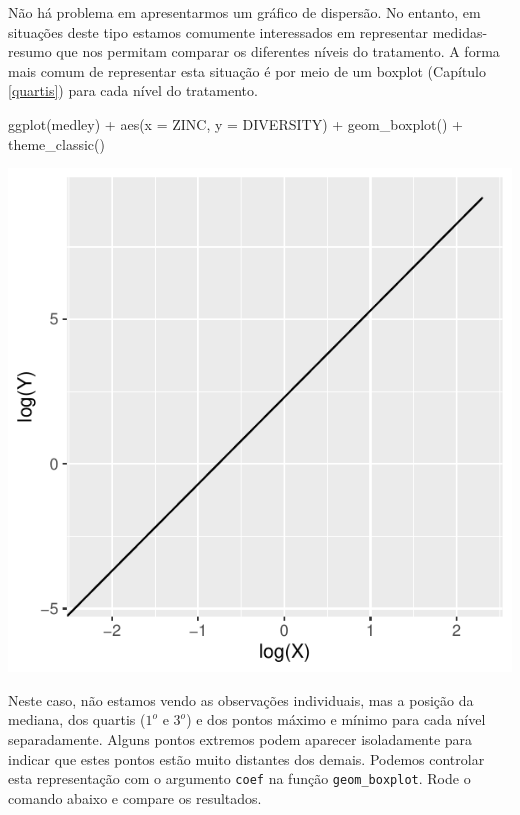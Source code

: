 \documentclass[
]{book}
\newenvironment{Shaded}{\begin{snugshade}}{\end{snugshade}}
\newcommand{\AttributeTok}[1]{\textcolor[rgb]{0.77,0.63,0.00}{#1}}
\newcommand{\FunctionTok}[1]{\textcolor[rgb]{0.00,0.00,0.00}{#1}}
\newcommand{\NormalTok}[1]{#1}
\newcommand{\SpecialCharTok}[1]{\textcolor[rgb]{0.00,0.00,0.00}{#1}}
\begin{document}
Não há problema em apresentarmos um gráfico de dispersão. No entanto, em situações deste tipo estamos comumente interessados em representar medidas-resumo que nos permitam comparar os diferentes níveis do tratamento. A forma mais comum de representar esta situação é por meio de um boxplot (Capítulo \ref{quartis}) para cada nível do tratamento.

\begin{Shaded}
\begin{Highlighting}[]
\FunctionTok{ggplot}\NormalTok{(medley) }\SpecialCharTok{+}
  \FunctionTok{aes}\NormalTok{(}\AttributeTok{x =}\NormalTok{ ZINC, }\AttributeTok{y =}\NormalTok{ DIVERSITY) }\SpecialCharTok{+}
  \FunctionTok{geom\_boxplot}\NormalTok{() }\SpecialCharTok{+}
  \FunctionTok{theme\_classic}\NormalTok{()}
\end{Highlighting}
\end{Shaded}

\includegraphics{probest-cambientais_files/figure-latex/unnamed-chunk-215-1.pdf}

Neste caso, não estamos vendo as observações individuais, mas a posição da mediana, dos quartis (\(1^o\) e \(3^o\)) e dos pontos máximo e mínimo para cada nível separadamente. Alguns pontos extremos podem aparecer isoladamente para indicar que estes pontos estão muito distantes dos demais. Podemos controlar esta representação com o argumento \texttt{coef} na função \texttt{geom\_boxplot}. Rode o comando abaixo e compare os resultados.
\end{document}

